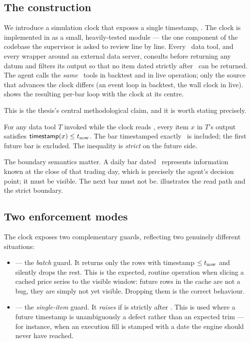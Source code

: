 \subsection{The construction}

We introduce a simulation clock that exposes a single timestamp, \tnow. The clock is
implemented in  as a small, heavily-tested module --- the one component of
the codebase the supervisor is asked to review line by line. Every \mcp\ data tool, and
every wrapper around an external data server, consults  before
returning any datum and filters its output so that no item dated strictly after \tnow\ can
be returned. The agent calls the \emph{same} \mcp\ tools in backtest and in live operation;
only the source that advances the clock differs (an event loop in backtest, the wall clock
in live).  shows the resulting per-bar loop with the clock at its centre.



This is the thesis's central methodological claim, and it is worth stating precisely.

\begin{invariant}
\label{inv:nolookahead}
For any data tool $T$ invoked while the clock reads \tnow, every item $x$ in $T$'s output
satisfies $\textsf{timestamp}(x) \le t_{\text{now}}$. The bar timestamped exactly \tnow\ is
included; the first future bar is excluded. The inequality is \emph{strict} on the future
side.
\end{invariant}

The boundary semantics matter. A daily bar dated \tnow\ represents information known at the
close of that trading day, which is precisely the agent's decision point; it must be
visible. The next bar must not be.  illustrates the read path and the
strict boundary.



\subsection{Two enforcement modes}

The clock exposes two complementary guards, reflecting two genuinely different situations:

\begin{itemize}
  \item {} --- the \emph{batch} guard. It returns only
  the rows with timestamp $\le t_{\text{now}}$ and silently drops the rest. This is the expected,
  routine operation when slicing a cached price series to the visible window: future rows
  in the cache are not a bug, they are simply not yet visible. Dropping them is the correct
  behaviour.
  \item {} --- the \emph{single-item} guard. It
  \emph{raises}  if  is strictly after \tnow. This is used
  where a future timestamp is unambiguously a defect rather than an expected trim --- for
  instance, when an execution fill is stamped with a date the engine should never have
  reached.
\end{itemize}

